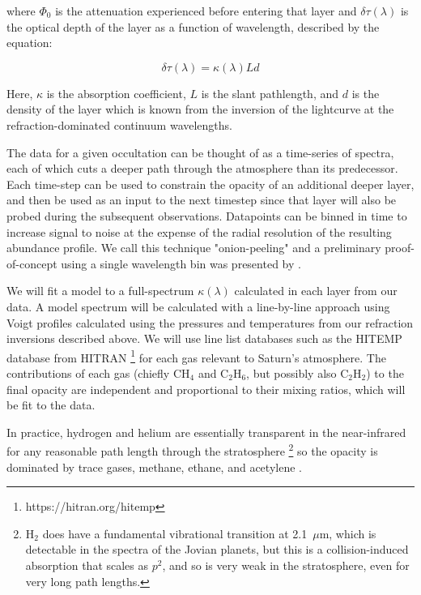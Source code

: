 \documentclass[12pt]{article}
\begin{document}
\noindent where $\Phi_0$ is the attenuation experienced before entering that layer
and $\delta\tau(\lambda)$ is the optical depth of the layer as a function of
wavelength, described by the equation:

\begin{equation}
\delta\tau(\lambda) = \kappa(\lambda) L d
\label{eq:optical_depth}
\end{equation}

\noindent Here, $\kappa$ is the absorption coefficient, $L$ is the slant
pathlength, and $d$ is the density of the layer which is known from the
inversion of the lightcurve at the refraction-dominated continuum wavelengths.

The data for a given occultation can be thought of as a time-series of spectra,
each of which cuts a deeper path through the atmosphere than its predecessor.
Each time-step can be used to constrain the opacity of an additional deeper
layer, and then be used as an input to the next timestep since that layer will
also be probed during the subsequent observations. Datapoints can be binned in
time to increase signal to noise at the expense of the radial resolution of the
resulting abundance profile. We call this technique "onion-peeling" and a
preliminary proof-of-concept using a single wavelength bin was presented by
\cite{Banfield11}.

We will fit a model to a full-spectrum $\kappa(\lambda)$ calculated in each
layer from our data. A model spectrum will be calculated with a line-by-line
approach using Voigt profiles calculated using the pressures and temperatures
from our refraction inversions described above.  We will use line list
databases such as the HITEMP database from HITRAN
\footnote{https://hitran.org/hitemp} \citep{Gordon17b} for each gas relevant to
Saturn's atmosphere. The contributions of each gas (chiefly CH$_4$ and
C$_2$H$_6$, but possibly also C$_2$H$_2$) to the final opacity are independent
and proportional to their mixing ratios, which will be fit to the data.

In practice, hydrogen and helium are essentially transparent in the
near-infrared for any reasonable path length through the stratosphere
\footnote{H$_2$ does have a fundamental vibrational transition at 2.1~$\mu$m,
which is detectable in the spectra of the Jovian planets, but this is a
collision-induced absorption that scales as  $p^2$, and so is very weak in the
stratosphere, even for very long path lengths.}  so the opacity is dominated by
trace gases, methane, ethane, and acetylene \citep{Moses05}.
\end{document}
